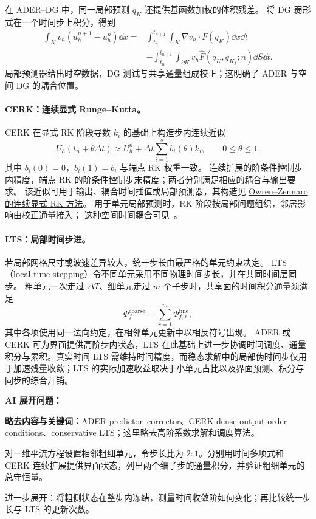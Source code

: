 在 ADER--DG 中，同一局部预测 $q_K$ 还提供基函数加权的体积残差。
将 DG 弱形式在一个时间步上积分，得到
\[
\begin{aligned}
\int_Kv_h(u_h^{n+1}-u_h^n)\dd x
={}&\int_{t_n}^{t_{n+1}}\int_K\nabla v_h\cdot F(q_K)\dd x\dd t\\
&-\int_{t_n}^{t_{n+1}}\int_{\partial K}v_h\widehat F(q_K,q_{K_f};n)\dd S\dd t.
\end{aligned}
\]
局部预测器给出时空数据，DG 测试与共享通量组成校正；这明确了 ADER 与空间 DG 的耦合位置。

\paragraph{CERK：连续显式 Runge--Kutta。}
CERK 在显式 RK 阶段导数 $k_i$ 的基础上构造步内连续近似
\[
U_h(t_n+\theta\Delta t)\approx
U_h^n+\Delta t\sum_{i=1}^{s}b_i(\theta)k_i,\qquad 0\le\theta\le1.
\]
其中 $b_i(0)=0$，$b_i(1)=b_i$ 与端点 RK 权重一致。
连续扩展的阶条件控制步内精度，端点 RK 的阶条件控制步末精度；两者分别满足相应的耦合与输出要求。
该近似可用于输出、耦合时间插值或局部预测器，其构造见
\href{https://doi.org/10.1137/0913084}{Owren--Zennaro 的连续显式 RK 方法}。
用于单元局部预测时，RK 阶段按局部问题组织，邻居影响由校正通量接入；
这种空间时间耦合可见~\cite{altmann2010}。

\paragraph{LTS：局部时间步进。}
若局部网格尺寸或波速差异较大，统一步长由最严格的单元约束决定。
LTS（local time stepping）令不同单元采用不同物理时间步长，并在共同时间层同步。
粗单元一次走过 $\Delta T$、细单元走过 $m$ 个子步时，共享面的时间积分通量须满足
\[
\Phi_f^{\mathrm{coarse}}
=\sum_{r=1}^{m}\Phi_{f,r}^{\mathrm{fine}},
\]
其中各项使用同一法向约定，在相邻单元更新中以相反符号出现。
ADER 或 CERK 可为界面提供高阶步内状态，LTS 在此基础上进一步协调时间调度、通量积分与累积。真实时间 LTS 需维持时间精度，而稳态求解中的局部伪时间步仅用于加速残量收敛；LTS 的实际加速收益取决于小单元占比以及界面预测、积分与同步的综合开销。

\begin{askai}
\textbf{AI 展开问题：}\par
\textbf{略去内容与关键词：}ADER predictor--corrector、CERK dense-output order conditions、conservative LTS；这里略去高阶系数求解和调度算法。

对一维平流方程设置相邻粗细单元，令步长比为 $2:1$。分别用时间多项式和 CERK 连续扩展提供界面状态，列出两个细子步的通量积分，并验证粗细单元的总守恒量。

进一步展开：将粗侧状态在整步内冻结，测量时间收敛阶如何变化；再比较统一步长与 LTS 的更新次数。
\end{askai}

